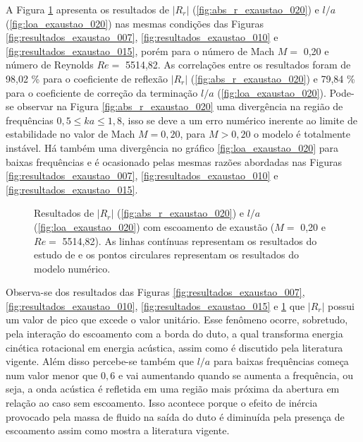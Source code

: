 A Figura \ref{fig:resultados_exaustao_020} apresenta os resultados de $|R_{r}|$ (\ref{fig:abs_r_exaustao_020}) e  $l/a$ (\ref{fig:loa_exaustao_020}) nas mesmas condições das Figuras \ref{fig:resultados_exaustao_007}, \ref{fig:resultados_exaustao_010} e \ref{fig:resultados_exaustao_015}, porém para o número de Mach $M =$ 0,20 e número de Reynolds $Re =$ 5514,82. As correlações entre os resultados foram de 98,02 \% para o coeficiente de reflexão $|R_{r}|$ (\ref{fig:abs_r_exaustao_020}) e 79,84 \% para o coeficiente de correção da terminação $l/a$ (\ref{fig:loa_exaustao_020}). Pode-se observar na Figura \ref{fig:abs_r_exaustao_020} uma divergência na região de frequências $0,5 \leq ka \leq 1,8$, isso se deve a um erro numérico inerente ao limite de estabilidade no valor de Mach $M = 0,20$, para $M > 0,20$ o modelo é totalmente instável. Há também uma divergência no gráfico \ref{fig:loa_exaustao_020} para baixas frequências e é ocasionado pelas mesmas razões abordadas nas Figuras \ref{fig:resultados_exaustao_007}, \ref{fig:resultados_exaustao_010} e \ref{fig:resultados_exaustao_015}.


\begin{figure}[ht!]
\begin{subfigure}{\scaleA \textwidth}
  
\end{subfigure}%
\begin{subfigure}{\scaleA \textwidth}
  
\end{subfigure}
\caption[Resultados de $|R_{r}|$ e $l/a$ com escoamento de exaustão (M $=$ 0,2 e Re $=$ 5514,82)]{Resultados de $|R_{r}|$ (\ref{fig:abs_r_exaustao_020}) e $l/a$ (\ref{fig:loa_exaustao_020}) com escoamento de exaustão ($M =$ 0,20 e $Re =$ 5514,82). As linhas contínuas representam os resultados do estudo de  e os pontos circulares representam os resultados do modelo numérico.}
\label{fig:resultados_exaustao_020}
\end{figure}

\newpage
Observa-se dos resultados das Figuras \ref{fig:resultados_exaustao_007}, \ref{fig:resultados_exaustao_010}, \ref{fig:resultados_exaustao_015} e \ref{fig:resultados_exaustao_020} que $|R_{r}|$ possui um valor de pico que excede o valor unitário. Esse fenômeno ocorre, sobretudo, pela interação do escoamento com a borda do duto, a qual transforma energia cinética rotacional em energia acústica, assim como é discutido pela literatura vigente. Além disso percebe-se também que $l/a$ para baixas frequências começa num valor menor que $0,6$ e vai aumentando quando se aumenta a frequência, ou seja, a onda acústica é refletida em uma região mais próxima da abertura em relação ao caso sem escoamento. Isso acontece porque o efeito de inércia provocado pela massa de fluido na saída do duto é diminuída pela presença de escoamento assim como mostra a literatura vigente.

